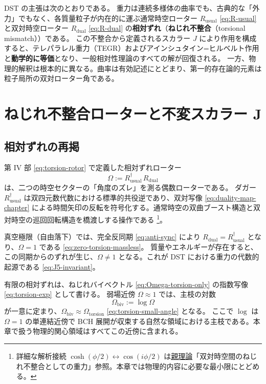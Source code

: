 \documentclass[dvipdfmx,a4paper,oneside]{jsbook}
\numberwithin{equation}{chapter}
\begin{document}
DST の主張は次のとおりである。
重力は連続多様体の曲率でも、古典的な「外力」でもなく、各質量粒子が内在的に運ぶ通常時空ローター \(R_{\mathrm{usual}}\) \eqref{eq:R-usual} と双対時空ローター \(R_{\mathrm{dual}}\) \eqref{eq:R-dual} の\textbf{相対ずれ}（\textbf{ねじれ不整合}（torsional mismatch））である。
この不整合から定義されるスカラー \(J\) により作用を構成すると、テレパラレル重力（TEGR）およびアインシュタイン=ヒルベルト作用と\textbf{動学的に等価}となり、一般相対性理論のすべての解が回復される。
一方、物理的解釈は根本的に異なる。曲率は有効記述にとどまり、第一的存在論的元素は粒子局所の双対ローター角である。

\section{ねじれ不整合ローターと不変スカラー J}

\subsection{相対ずれの再掲}

第 IV 部 \eqref{eq:torsion-rotor} で定義した相対ずれローター
\begin{equation}
  \Omega := R_{\mathrm{usual}}^\dagger\, R_{\mathrm{dual}}
  \label{eq:gravity-torsion-rotor}
\end{equation}
は、二つの時空セクターの「角度のズレ」を測る偶数ローターである。
ダガー \(R_{\mathrm{usual}}^\dagger\) は双四元数代数における標準的共役逆であり、双対写像 \eqref{eq:duality-map-chapter} による時間矢印の反転を符号化する。通常時空の双曲ブースト構造と双対時空の巡回回転構造を橋渡しする操作である \footnote{詳細な解析接続 \(\cosh(\phi/2) \leftrightarrow \cos(i\phi/2)\) は\hyperref[sec:sister-manuscripts]{親理論}「双対時空間のねじれ不整合としての重力」参照。本章では物理的内容に必要な最小限にとどめる。}。

真空極限（自由落下）では、完全反同期 \eqref{eq:anti-sync} により \(R_{\mathrm{dual}} = R_{\mathrm{usual}}^\dagger\) となり、\(\Omega = 1\) である \eqref{eq:zero-torsion-massless}。
質量やエネルギーが存在すると、この同期からのずれが生じ、\(\Omega \neq 1\) となる。これが DST における重力の代数的起源である \eqref{eq:J5-invariant}。

有限の相対ずれは、ねじれバイベクトル \eqref{eq:Omega-torsion-only} の指数写像 \eqref{eq:torsion-exp} として書ける。
弱場近傍 \(\Omega \approx 1\) では、主枝の対数
\begin{equation}
  \Omega_{\mathrm{biv}} := \log \Omega
  \label{eq:gravity-omega-biv}
\end{equation}
が一意に定まり、\(\Omega_{\mathrm{biv}} \approx \Omega_{\mathrm{torsion}}\) \eqref{eq:torsion-small-angle} となる。
ここで \(\log\) は \(\Omega = 1\) の単連結近傍で BCH 展開が収束する自然な領域における主枝である。本章で扱う物理的関心領域はすべてこの近傍に含まれる。
\end{document}
